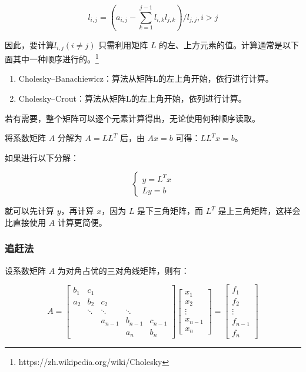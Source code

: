 \[
    l_{i,j} = (a_{i,j} - \sum_{k=1}^{j-1}l_{i,k}l_{j,k}) / l_{j,j},  i > j
\]

因此，要计算${l}_{i,j}(i\neq j)$ 只需利用矩阵 $L$ 的左、上方元素的值。计算通常是以下面其中一种顺序进行的。\footnote{https://zh.wikipedia.org/wiki/Cholesky}

\begin{enumerate}
    \item Cholesky–Banachiewicz：算法从矩阵L的左上角开始，依行进行计算。
    \item Cholesky–Crout：算法从矩阵L的左上角开始，依列进行计算。
\end{enumerate}

若有需要，整个矩阵可以逐个元素计算得出，无论使用何种顺序读取。

将系数矩阵 \(A\) 分解为 \(A = L L^T\) 后，由 \(Ax = b\)
可得：\(LL^Tx = b\)。

如果进行以下分解：

\[
    \left\{\begin{matrix}
        y = L^Tx \\
        Ly = b
    \end{matrix}\right.
\]


就可以先计算 \(y\)，再计算 \(x\)，因为 \(L\) 是下三角矩阵，而 \(L^T\)
是上三角矩阵，这样会比直接使用 \(A\) 计算更简便。

\subsubsection{追赶法}

设系数矩阵 $A$ 为对角占优的三对角线矩阵，则有：

\begin{equation}
    A =
    \begin{bmatrix}
        b_1 & c_1                                  \\
        a_2 & b_2    & c_2                         \\
            & \ddots & \ddots  & \ddots            \\
            &        & a_{n-1} & b_{n-1} & c_{n-1} \\
            &        &         & a_n     & b_n
    \end{bmatrix}
    \begin{bmatrix}
        x_1     \\
        x_2     \\
        \vdots  \\
        x_{n-1} \\
        x_n
    \end{bmatrix}
    =
    \begin{bmatrix}
        f_1     \\
        f_2     \\
        \vdots  \\
        f_{n-1} \\
        f_n
    \end{bmatrix}
    \label{追赶法:三对角线方程组}
\end{equation}

